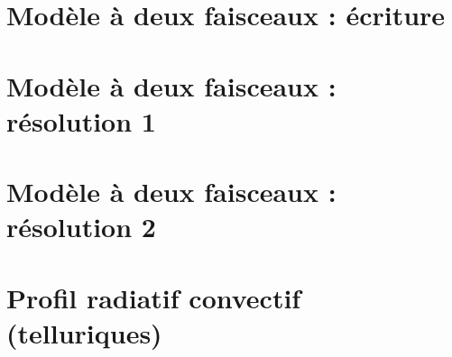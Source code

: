 \documentclass[a4paper,DIV16,10pt]{scrartcl}
\begin{document}
\newpage
\section{Modèle à deux faisceaux : écriture}


\newpage
\section{Modèle à deux faisceaux : résolution 1}


\newpage
\section{Modèle à deux faisceaux : résolution 2}


\newpage
\section{Profil radiatif convectif (telluriques)}

\end{document}
